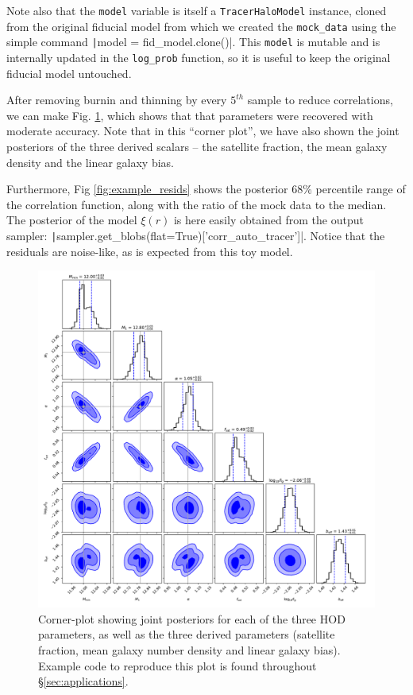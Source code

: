 \documentclass[5p,aas_macros]{elsarticle}
\begin{document}
Note also that the \verb|model| variable is itself a \texttt{Tracer\-Halo\-Model} instance, cloned from the original fiducial model from which we created the \verb|mock_data| using the simple command \texttt|model = fid_model.clone()|. 
This \verb|model| is mutable and is internally updated in the \verb|log_prob| function, so it is useful to keep the original fiducial model untouched.

After removing burnin and thinning by every $5^{th}$ sample to reduce correlations, we can make Fig. \ref{fig:example1_corner}, which shows that that parameters were recovered with moderate accuracy. 
Note that in this ``corner plot'', we have also shown the joint posteriors of the three derived scalars -- the satellite fraction, the mean galaxy density and the linear galaxy bias.  

Furthermore, Fig \ref{fig:example_resids} shows the posterior 68\%  percentile range of the correlation function, along with the ratio of the mock data to the median. The posterior of the model $\xi(r)$ is here easily obtained from the output sampler: \texttt|sampler.get_blobs(flat=True)['corr_auto_tracer']|. Notice that the residuals are noise-like, as is expected from this toy model.

\begin{figure}
    \centering
    \includegraphics[width=\textwidth]{figures/default_corner.pdf}
    \caption{Corner-plot showing joint posteriors for each of the three HOD parameters, as well as the three derived parameters (satellite fraction, mean galaxy number density and linear galaxy bias). Example code to reproduce this plot is found throughout \S\ref{sec:applications}. }
    \label{fig:example1_corner}
\end{figure}
\end{document}
